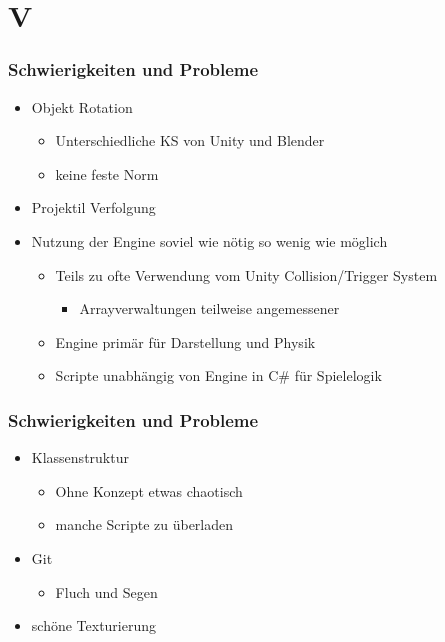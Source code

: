 ﻿\documentclass{beamer}
\begin{document}
\section{V}
\begin{frame} %
  \frametitle{Schwierigkeiten und Probleme} %
  
	\begin{itemize}
			\item Objekt Rotation
			
				\begin{itemize}
					\item Unterschiedliche KS von Unity und Blender
					\item keine feste Norm
				\end{itemize}
			
			\item Projektil Verfolgung
			
			\item Nutzung der Engine soviel wie nötig so wenig wie möglich
			
				\begin{itemize}
					\item Teils zu ofte Verwendung vom Unity Collision/Trigger System
					
						\begin{itemize}
							\item Arrayverwaltungen teilweise angemessener
						\end{itemize}
				
					\item Engine primär für Darstellung und Physik
					\item Scripte unabhängig von Engine in C\# für Spielelogik 
				\end{itemize}
		\end{itemize}
	
\end{frame}

\begin{frame} %
  \frametitle{Schwierigkeiten und Probleme} %
  
	\begin{itemize}
			\item Klassenstruktur
			
				\begin{itemize}
					\item Ohne Konzept etwas chaotisch
					\item manche Scripte zu überladen
				\end{itemize}
				
			\item Git
				\begin{itemize}
					\item Fluch und Segen		
				\end{itemize}
				
			\item schöne Texturierung
		\end{itemize}
	
\end{frame}
\end{document}

